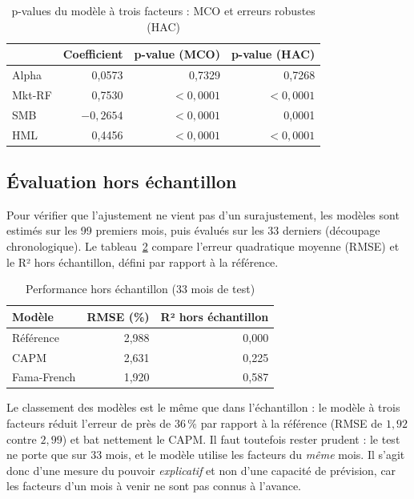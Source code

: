 \documentclass[11pt,a4paper]{article}
\begin{document}
\begin{table}[H]
\centering
\caption{p-values du modèle à trois facteurs : MCO et erreurs robustes (HAC)}
\label{tab:hac}
\begin{tabular}{lrrr}
\toprule
 & Coefficient & p-value (MCO) & p-value (HAC) \\
\midrule
Alpha & 0,0573 & 0,7329 & 0,7268 \\
Mkt-RF & 0,7530 & $<0{,}0001$ & $<0{,}0001$ \\
SMB & $-0{,}2654$ & $<0{,}0001$ & 0,0001 \\
HML & 0,4456 & $<0{,}0001$ & $<0{,}0001$ \\
\bottomrule
\end{tabular}
\end{table}

\subsection{Évaluation hors échantillon}
Pour vérifier que l'ajustement ne vient pas d'un surajustement, les modèles sont estimés sur les 99 premiers mois, puis évalués sur les 33 derniers (découpage chronologique). Le tableau~\ref{tab:oos} compare l'erreur quadratique moyenne (RMSE) et le R² hors échantillon, défini par rapport à la référence.

\begin{table}[H]
\centering
\caption{Performance hors échantillon (33 mois de test)}
\label{tab:oos}
\begin{tabular}{lrr}
\toprule
Modèle & RMSE (\%) & R² hors échantillon \\
\midrule
Référence & 2,988 & 0,000 \\
CAPM & 2,631 & 0,225 \\
Fama-French & 1,920 & 0,587 \\
\bottomrule
\end{tabular}
\end{table}

Le classement des modèles est le même que dans l'échantillon : le modèle à trois facteurs réduit l'erreur de près de 36\,\% par rapport à la référence (RMSE de $1{,}92$ contre $2{,}99$) et bat nettement le CAPM. Il faut toutefois rester prudent : le test ne porte que sur 33 mois, et le modèle utilise les facteurs du \emph{même} mois. Il s'agit donc d'une mesure du pouvoir \emph{explicatif} et non d'une capacité de prévision, car les facteurs d'un mois à venir ne sont pas connus à l'avance.

\end{document}
